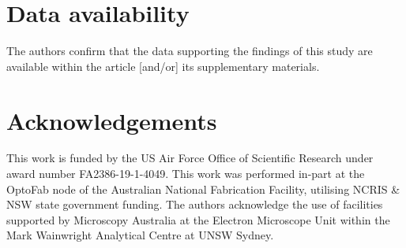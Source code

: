 \documentclass[11pt]{article}
\begin{document}
\section*{Data availability}
The authors confirm that the data supporting the findings of this study are available within the article [and/or] its supplementary materials.

\section*{Acknowledgements}
This work is funded by the US Air Force Office of Scientific Research under award number FA2386-19-1-4049. This work was performed in-part at the OptoFab node of the Australian National Fabrication Facility, utilising NCRIS \& NSW state government funding. The authors acknowledge the use of facilities supported by Microscopy Australia at the Electron Microscope Unit within the Mark Wainwright Analytical Centre at UNSW Sydney.

\printbibliography
\end{document}
